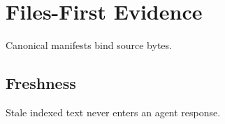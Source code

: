 \documentclass{article}
\begin{document}
\section{Files-First Evidence}
Canonical manifests bind source bytes.
\subsection{Freshness}
Stale indexed text never enters an agent response.
\end{document}

